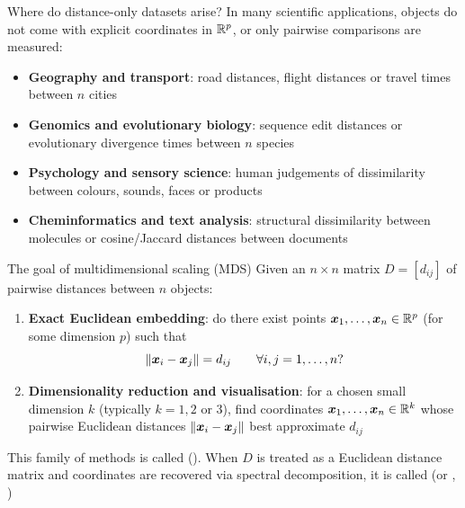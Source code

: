 \documentclass[aspectratio=169]{beamer}\usepackage[]{graphicx}\usepackage[]{xcolor}
\begin{document}
\begin{frame}{Where do distance-only datasets arise?}
In many scientific applications, objects do not come with explicit coordinates in $\mathbb{R}^p$, or only pairwise comparisons are measured:
\vfill
\begin{itemize}
\item \textbf{Geography and transport}: road distances, flight distances or travel times between $n$ cities
\vfill
\item \textbf{Genomics and evolutionary biology}: sequence edit distances or evolutionary divergence times between $n$ species
\vfill
\item \textbf{Psychology and sensory science}: human judgements of dissimilarity between colours, sounds, faces or products
\vfill
\item \textbf{Cheminformatics and text analysis}: structural dissimilarity between molecules or cosine/Jaccard distances between documents
\end{itemize}
\end{frame}

\begin{frame}{The goal of multidimensional scaling (MDS)}
Given an $n\times n$ matrix $D = [d_{ij}]$ of pairwise distances between $n$ objects:
\vfill
\begin{enumerate}
\item \textbf{Exact Euclidean embedding}: do there exist points $\bm{x}_1,\ldots,\bm{x}_n\in\mathbb{R}^p$ (for some dimension $p$) such that
\[
\|\bm{x}_i - \bm{x}_j\| = d_{ij} \qquad \forall i,j=1,\ldots,n\text{?}
\]
\vfill
\item \textbf{Dimensionality reduction and visualisation}: for a chosen small dimension $k$ (typically $k=1, 2$ or $3$), find coordinates $\bm{x}_1,\ldots,\bm{x}_n\in\mathbb{R}^k$ whose pairwise Euclidean distances $\|\bm{x}_i - \bm{x}_j\|$ best approximate $d_{ij}$
\end{enumerate}
\vfill
This family of methods is called  (). When $D$ is treated as a Euclidean distance matrix and coordinates are recovered via spectral decomposition, it is called  (or , )
\end{frame}
\end{document}

